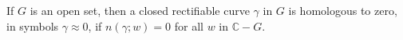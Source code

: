 If $G$ is an open set, then a closed rectifiable curve $\gamma$ in $G$ is homologous to zero, in symbols $\gamma \approx 0$, if $n(\gamma; w) = 0$ for all $w$ in $\mathbb{C} - G$.
